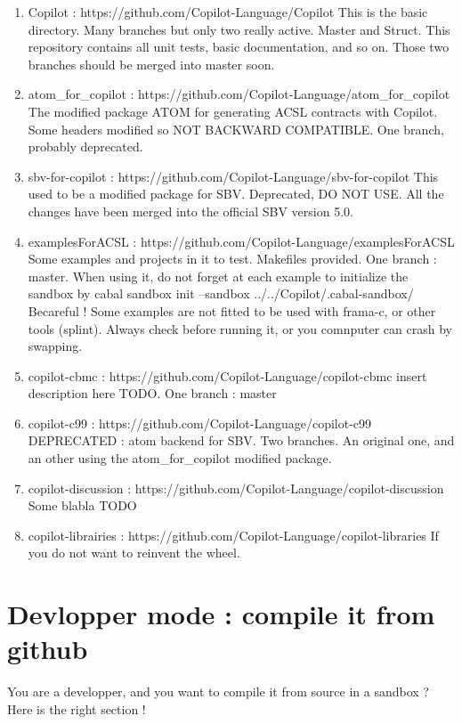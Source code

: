 \documentclass[11pt]{article}
\begin{document}
\begin{enumerate}
\item Copilot : https://github.com/Copilot-Language/Copilot   This is the basic directory. Many branches but only two really active. Master and Struct. This repository contains all unit tests, basic documentation, and so on. Those two branches should be merged into master soon.
\item atom\_for\_copilot : https://github.com/Copilot-Language/atom\_for\_copilot   The modified package ATOM for generating ACSL contracts with Copilot. Some headers modified so NOT BACKWARD COMPATIBLE. One branch, probably deprecated.
\item sbv-for-copilot : https://github.com/Copilot-Language/sbv-for-copilot This used to be a modified package for SBV. Deprecated, DO NOT USE. All the changes have been merged into the official SBV version 5.0.
\item examplesForACSL : https://github.com/Copilot-Language/examplesForACSL  Some examples and projects in it to test. Makefiles provided. One branch : master. When using it, do not forget at each example to initialize the sandbox by cabal sandbox init --sandbox ../../Copilot/.cabal-sandbox/ 
\subitem Becareful ! Some examples are not fitted to be used with frama-c, or other tools (splint). Always check before running it, or you comnputer can crash by swapping.
\item copilot-cbmc : https://github.com/Copilot-Language/copilot-cbmc  insert description here TODO. One branch : master
\item copilot-c99 : https://github.com/Copilot-Language/copilot-c99  DEPRECATED : atom backend for SBV. Two branches. An original one, and an other using the atom\_for\_copilot modified package.
\item copilot-discussion : https://github.com/Copilot-Language/copilot-discussion Some blabla TODO
\item copilot-librairies : https://github.com/Copilot-Language/copilot-libraries  If you do not want to reinvent the wheel. 

\end{enumerate}


\section{Devlopper mode : compile it from github}


You are a developper, and you want to compile it from source in a sandbox ? Here is the right section ! 
\end{document}
